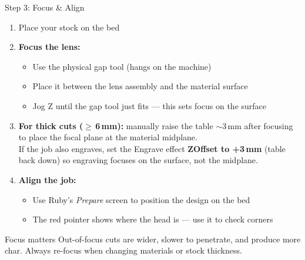 \documentclass[aspectratio=169]{beamer}
\begin{document}
\begin{frame}{Step 3: Focus \& Align}
\begin{enumerate}
    \item Place your stock on the bed
    \item \textbf{Focus the lens:}
    \begin{itemize}
        \item Use the physical gap tool (hangs on the machine)
        \item Place it between the lens assembly and the material surface
        \item Jog Z until the gap tool just fits --- this sets focus on the surface
    \end{itemize}
    \item \textbf{For thick cuts ($\geq$\,6\,mm):} manually raise the table $\sim$3\,mm
        after focusing to place the focal plane at the material midplane.\\
        {\small If the job also engraves, set the Engrave effect \textbf{ZOffset to +3\,mm}
        (table back down) so engraving focuses on the surface, not the midplane.}
    \item \textbf{Align the job:}
    \begin{itemize}
        \item Use Ruby's \emph{Prepare} screen to position the design on the bed
        \item The red pointer shows where the head is --- use it to check corners
    \end{itemize}
\end{enumerate}

\begin{exampleblock}{Focus matters}
Out-of-focus cuts are wider, slower to penetrate, and produce more char.
Always re-focus when changing materials or stock thickness.
\end{exampleblock}
\end{frame}
\end{document}

